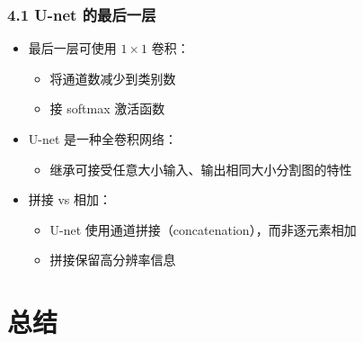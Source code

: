 \documentclass[t,aspectratio=169]{beamer} %
\begin{document}
\begin{frame}
    \frametitle{4.1 U-net 的最后一层}
    \begin{itemize}
        \item 最后一层可使用 $1 \times 1$ 卷积：
        \begin{itemize}
            \item 将通道数减少到\alert{类别数}
            \item 接 \alert{softmax} 激活函数
        \end{itemize}
        \item U-net 是一种\alert{全卷积网络}：
        \begin{itemize}
            \item 继承可接受任意大小输入、输出相同大小分割图的特性
        \end{itemize}
        \item 拼接 vs 相加：
        \begin{itemize}
            \item U-net 使用通道\alert{拼接}（concatenation），而非逐元素相加
            \item 拼接保留高分辨率信息
        \end{itemize}
    \end{itemize}
\end{frame}

\section{总结}
\end{document}
